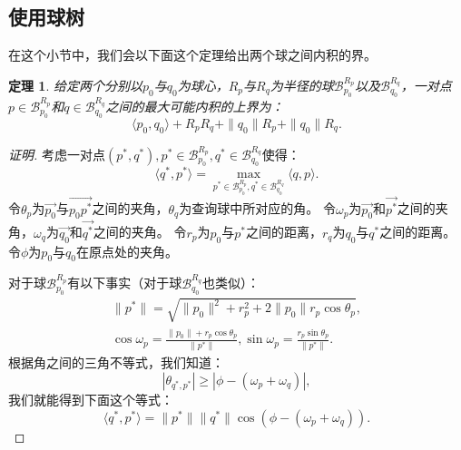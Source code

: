 \documentclass[twocolumn]{article}
\begin{document}
\subsection{使用球树}
在这个小节中，我们会以下面这个定理给出两个球之间内积的界。
\newtheorem{theorem2}{定理}[section]
\begin{theorem2}
给定两个分别以$p_0$与$q_0$为球心，$R_p$与$R_q$为半径的球$\mathcal{B}_{p_0}^{R_p}$以及$\mathcal{B}_{q_0}^{R_q}$，一对点$p\in\mathcal{B}_{p_0}^{R_p}$和$q\in\mathcal{B}_{q_0}^{R_q}$之间的最大可能内积的上界为：
\begin{equation}
\langle p_0,q_0 \rangle + R_p R_q + \|q_0\|R_p + \|q_0\|R_q.
\end{equation}
\end{theorem2}
\begin{proof}[证明]
考虑一对点$(p^*,q^*),p^*\in\mathcal{B}_{p_0}^{R_p},q^*\in\mathcal{B}_{q_0}^{R_q}$使得：
\begin{equation}
\langle q^*,p^* \rangle = \max_{p^*\in\mathcal{B}_{p_0}^{R_p},q^*\in\mathcal{B}_{q_0}^{R_q}} \langle q,p \rangle.
\end{equation}
令$\theta_p$为$\vec{p_0}$与$\vec{p_0 p^*}$之间的夹角，$\theta_q$为查询球中所对应的角。
令$\omega_p$为$\vec{p_0}$和$\vec{p^*}$之间的夹角，$\omega_q$为$\vec{q_0}$和$\vec{q^*}$之间的夹角。
令$r_p$为$p_0$与$p^*$之间的距离，$r_q$为$q_0$与$q^*$之间的距离。
令$\phi$为$p_0$与$q_0$在原点处的夹角。

对于球$\mathcal{B}_{p_0}^{R_p}$有以下事实（对于球$\mathcal{B}_{q_0}^{R_q}$也类似）：
\begin{gather*}
\|p^*\| = \sqrt{\|p_0\|^2+r_p^2+2\|p_0\|r_p\cos\theta_p}, \\
\cos\omega_p = \frac{\|p_0\|+r_p\cos\theta_p}{\|p^*\|},\sin\omega_p = \frac{r_p\sin\theta_p}{\|p^*\|}.
\end{gather*}
根据角之间的三角不等式，我们知道：
\begin{equation*}
|\theta_{q^*,p^*}| \ge |\phi - (\omega_p + \omega_q)|,
\end{equation*}
我们就能得到下面这个等式：
\begin{equation}
\langle q^*,p^* \rangle = \|p^*\|\|q^*\|\cos(\phi-(\omega_p+\omega_q)).
\end{equation}


\end{proof}
\end{document}
